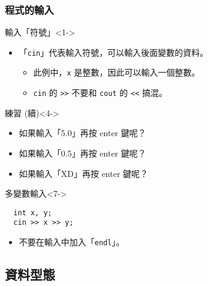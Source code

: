 \documentclass[utf8]{beamer}
\begin{document}
\begin{CJK}{UTF8}{bkai}
\begin{frame}[fragile]
  \frametitle{程式的輸入}
  \begin{exampleblock}{輸入「符號」}<1->
    \begin{itemize}
    \item 「\lstinline{cin}」代表輸入符號，可以輸入後面變數的資料。
      \begin{itemize}
      \item<2-> 此例中，\lstinline{x} 是整數，因此可以\alert{輸入一個整數}。
      \item<3-> \lstinline{cin} 的 \alert{\lstinline{>>}} 不要和 \lstinline{cout} 的 \alert{\lstinline{<<}} 搞混。
      \end{itemize}
    \end{itemize}
  \end{exampleblock}
  \begin{block}{練習 (續)}<4->
    \begin{itemize}
    \item 如果輸入「5.0」再按 enter 鍵呢？
    \item<5-> 如果輸入「0.5」再按 enter 鍵呢？
    \item<6-> 如果輸入「XD」再按 enter 鍵呢？
    \end{itemize}
  \end{block}
  \begin{alertblock}{多變數輸入}<7->
    \begin{lstlisting}
  int x, y;
  cin >> x >> y;
    \end{lstlisting}
    \begin{itemize}[<8->]
    \item 不要在輸入中加入「\lstinline{endl}」。
    \end{itemize}
  \end{alertblock}
\end{frame}

\subsection{資料型態}


\end{CJK}
\end{document}

